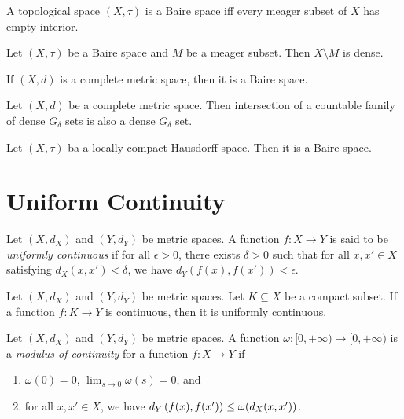 \documentclass[screen,single]{techreport}
\numberwithin{equation}{section}
\begin{document}
\begin{proposition}\label{Prop:BaireIffMeagerSetHasEmptyInt}
  A topological space $(X,\tau)$ is a Baire space iff every meager subset of $X$ has empty interior.
\end{proposition}

\begin{corollary}\label{Cor:BaireImplyComplementOfMeagerIsDense}
  Let $(X,\tau)$ be a Baire space and $M$ be a meager subset.
  Then $X \setminus M$ is dense.
\end{corollary}

\begin{theorem}\label{The:BaireCategory}
  If $(X,d)$ is a complete metric space, then it is a Baire space.
\end{theorem}

\begin{corollary}\label{Cor:CompleteMetricIntersectDenseGDeltaIsDenseGDelta}
  Let $(X,d)$ be a complete metric space.
  Then intersection of a countable family of dense $G_\delta$ sets is also a dense $G_\delta$ set.
\end{corollary}

\begin{theorem}\label{The:LocallyCompactT2ImplyBaire}
  Let $(X,\tau)$ ba a locally compact Hausdorff space.
  Then it is a Baire space.
\end{theorem}

\section{Uniform Continuity}

\begin{definition}\label{De:UniformContinuity}
  Let $(X,d_X)$ and $(Y,d_Y)$ be metric spaces.
  A function $f : X \to Y$ is said to be \emph{uniformly continuous} if for all $\epsilon > 0$, there exists $\delta >0$ such that for all $x,x' \in X$ satisfying $d_X(x,x') < \delta$, we have $d_Y(f(x),f(x')) < \epsilon$.
\end{definition}

\begin{proposition}\label{Prop:DomainCompactImplyContImplyUCont}
  Let $(X,d_X)$ and $(Y,d_Y)$ be metric spaces.
  Let $K \subseteq X$ be a compact subset.
  If a function $f : K \to Y$ is continuous, then it is uniformly continuous.
\end{proposition}

\begin{definition}\label{De:ModulusOfContinuity}
  Let $(X,d_X)$ and $(Y,d_Y)$ be metric spaces.
  A function $\omega : [0,+\infty) \to [0,+\infty)$ is a \emph{modulus of continuity} for a function $f : X \to Y$ if
  \begin{enumerate}
    \item $\omega(0) = 0$, $\lim_{s \to 0} \omega(s) = 0$, and
    \item for all $x,x' \in X$, we have $d_Y\left({f(x),f(x')}\right) \le \omega(d_X(x,x'))$.
  \end{enumerate}
\end{definition}
\end{document}
